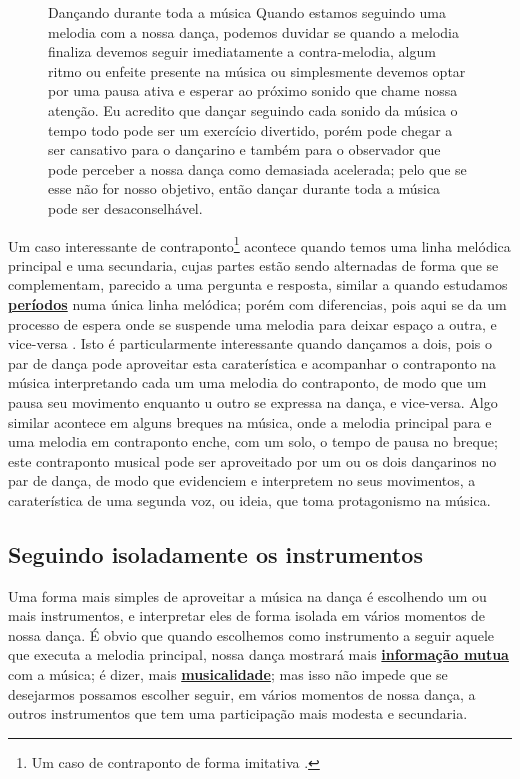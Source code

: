 \begin{figure}[!b]
\begin{tcbinformation}{Dançando durante toda a música}
Quando estamos seguindo uma melodia com a nossa dança,
podemos duvidar se quando a melodia finaliza devemos seguir imediatamente a 
contra-melodia, algum ritmo ou enfeite presente na música ou simplesmente devemos optar por uma 
pausa ativa e esperar ao próximo sonido que chame nossa atenção. 
Eu acredito que dançar seguindo cada sonido da música o tempo todo pode ser um exercício divertido, 
porém pode chegar a ser cansativo para o dançarino 
e também para o observador que pode perceber a nossa dança como demasiada acelerada;
pelo que se esse não for nosso objetivo, então dançar durante toda a música pode ser desaconselhável. 
\end{tcbinformation} 
\end{figure}
Um caso interessante de contraponto\footnote{Um 
caso de contraponto de forma imitativa \cite[pp. 100]{tragtenberg2002contraponto}.}
acontece quando temos uma linha melódica principal e uma secundaria, 
cujas partes estão sendo alternadas de forma que se complementam,
parecido a uma pergunta e resposta, similar a quando estudamos 
\hyperref[sec:Periodo]{\textbf{períodos}} numa única linha melódica;
porém com diferencias, pois aqui se da um processo de espera onde se suspende 
uma melodia para deixar espaço 
a outra, e vice-versa \cite[pp. 100, 111]{tragtenberg2002contraponto}.
Isto é particularmente interessante quando dançamos a dois,
pois o par de dança pode aproveitar esta caraterística 
e acompanhar o contraponto na música interpretando cada um 
uma melodia do contraponto, 
de modo que um pausa seu movimento enquanto u outro se expressa na dança, e vice-versa.
Algo similar acontece em alguns breques na música, onde a melodia principal para 
e uma melodia em contraponto enche, com um solo, o tempo de pausa no breque;
este contraponto musical pode ser aproveitado por um ou os dois dançarinos no par de dança,
de modo que evidenciem e interpretem no seus movimentos, 
a caraterística de uma segunda voz, ou ideia, que toma protagonismo na música.


\subsection{Seguindo isoladamente os instrumentos}
\label{sec:seguindoinstrumentos}
Uma forma mais simples de aproveitar a música na dança é escolhendo um ou mais instrumentos,
e interpretar eles de forma isolada em vários momentos de nossa dança. 
É obvio que quando escolhemos como instrumento a seguir aquele que executa a melodia principal,
nossa dança mostrará mais \hyperref[sec:musicalidadeinfmutua]{\textbf{informação mutua}} com a música; é dizer, 
mais \hyperref[sec:musicalidadeinfmutua]{\textbf{musicalidade}};
mas isso não impede que se desejarmos possamos escolher  
seguir, em vários momentos de nossa dança,
a outros instrumentos que tem uma participação mais modesta e secundaria.

